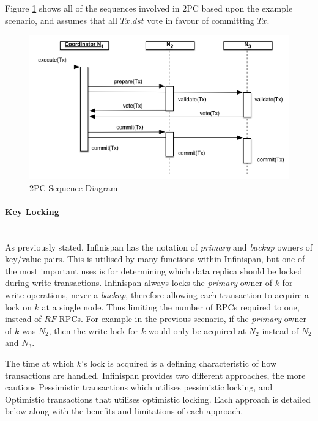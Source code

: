 	       Figure \ref{fig:2PC} shows all of the sequences involved in 2PC based upon the example scenario, and assumes that all $Tx.dst$ vote in favour of committing $Tx$.  
	       	       
            \begin{figure}[htbp!] 
                \centering    
                \includegraphics[width=1.0\textwidth]{2PC}
                \caption[Two-phase Commit Protocol]{2PC Sequence Diagram}
                \label{fig:2PC}
            \end{figure}
            
	        \paragraph{Key Locking} \hspace{0pt} \\
	        As previously stated, Infinispan has the notation of \emph{primary} and \emph{backup} owners of key/value pairs.  This is utilised by many functions within Infinispan, but one of the most important uses is for determining which data replica should be locked during write transactions.  Infinispan always locks the \emph{primary} owner of $k$ for write operations, never a \emph{backup}, therefore allowing each transaction to acquire a lock on $k$ at a single node.  Thus limiting the number of RPCs required to one, instead of $RF$ RPCs. For example in the previous scenario, if the \emph{primary} owner of $k$ was $N_2$, then the write lock for $k$ would only be acquired at $N_2$ instead of $N_2$ and $N_3$.  
	        
	        The time at which $k$'s lock is acquired is a defining characteristic of how transactions are handled.  Infinispan provides two different approaches, the more cautious Pessimistic transactions which utilises pessimistic locking, and Optimistic transactions that utilises optimistic locking.  Each approach is detailed below along with the benefits and limitations of each approach.  
	         
